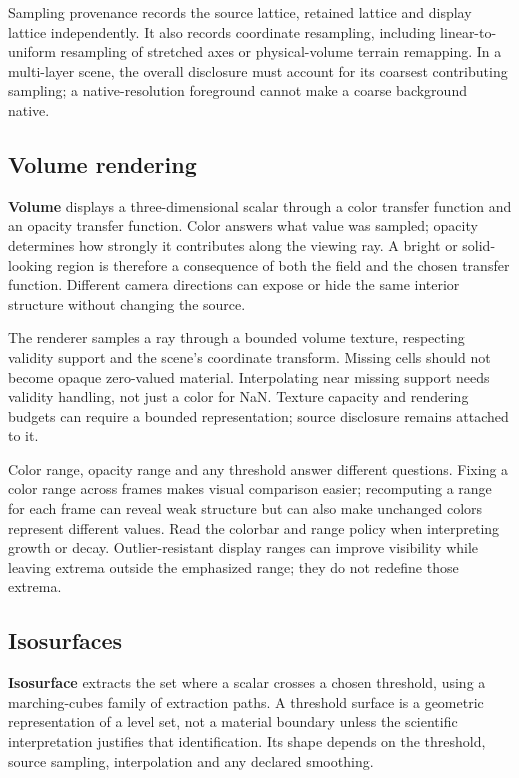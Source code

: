 Sampling provenance records the source lattice, retained lattice and display
lattice independently. It also records coordinate resampling, including
linear-to-uniform resampling of stretched axes or physical-volume terrain
remapping. In a multi-layer scene, the overall disclosure must account for its
coarsest contributing sampling; a native-resolution foreground cannot make a
coarse background native.

\subsection{Volume rendering}
\textbf{Volume} displays a three-dimensional scalar through a color transfer
function and an opacity transfer function. Color answers what value was sampled;
opacity determines how strongly it contributes along the viewing ray. A bright
or solid-looking region is therefore a consequence of both the field and the
chosen transfer function. Different camera directions can expose or hide the
same interior structure without changing the source.

The renderer samples a ray through a bounded volume texture, respecting validity
support and the scene's coordinate transform. Missing cells should not become
opaque zero-valued material. Interpolating near missing support needs validity
handling, not just a color for NaN. Texture capacity and rendering budgets can
require a bounded representation; source disclosure remains attached to it.

Color range, opacity range and any threshold answer different questions. Fixing
a color range across frames makes visual comparison easier; recomputing a range
for each frame can reveal weak structure but can also make unchanged colors
represent different values. Read the colorbar and range policy when interpreting
growth or decay. Outlier-resistant display ranges can improve visibility while
leaving extrema outside the emphasized range; they do not redefine those extrema.

\subsection{Isosurfaces}
\textbf{Isosurface} extracts the set where a scalar crosses a chosen threshold,
using a marching-cubes family of extraction paths. A threshold surface is a
geometric representation of a level set, not a material boundary unless the
scientific interpretation justifies that identification. Its shape depends on
the threshold, source sampling, interpolation and any declared smoothing.


